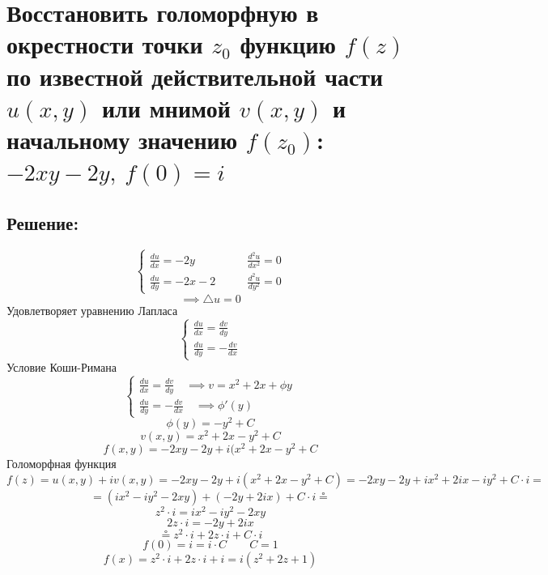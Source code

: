 \documentclass{article}
\begin{document}
         \section{Восстановить голоморфную в окрестности точки $z_0$ функцию $f(z)$ по известной действительной части $u(x,y)$ или мнимой $v(x,y)$ и начальному значению $f(z_0)$: $-2xy-2y, \ f(0) = i$}
	\subsection{Решение:}
        \begin{equation}
        \left\{
        \begin{array}{ll}
        \frac{du}{dx} = -2y & \quad\quad \frac{d^2u}{dx^2} = 0 \\
        \frac{du}{dy} = -2x - 2 & \quad\quad \frac{d^2u}{dy^2} = 0
        \end{array}
        \right.
        \end{equation}
        $$\implies \triangle u = 0$$
        Удовлетворяет уравнению Лапласа \\
         \begin{equation}
        \left\{
        \begin{array}{ll}
        \frac{du}{dx} = \frac{dv}{dy} \\
        \frac{du}{dy} = -\frac{dv}{dx}
        \end{array}
        \right.
        \end{equation}
        Условие Коши-Римана\\
        \begin{equation}
        \left\{
        \begin{array}{ll}
        \frac{du}{dx} = \frac{dv}{dy} \quad \implies v = x^2 + 2x + \phi{y} \\
        \frac{du}{dy} = -\frac{dv}{dx} \quad \implies \phi'{(y)}
        \end{array}
        \right.
        \end{equation}
        $$\phi(y) = -y^2 + C$$
        $$v(x, y) = x^2 + 2x - y^2 + C$$
        $$f(x, y) = -2xy - 2y + i(x^2 + 2x - y^2 + C$$
        Голоморфная функция \\
        $$f(z) = u(x, y) + iv(x, y) = -2xy - 2y + i(x^2 + 2x - y^2 + C) = -2xy - 2y + ix^2 + 2ix - iy^2 + C \cdot i =$$
        $$= (ix^2 - iy^2 - 2xy) + (-2y + 2ix) + C \cdot i \circeq$$
        $$z^2 \cdot i = ix^2 - iy^2 - 2xy$$
        $$2z \cdot i = -2y + 2ix$$
        $$\circeq z^2 \cdot i + 2z \cdot i + C \cdot i$$
        $$f(0) = i = i \cdot C \quad\quad C = 1$$
        $$f(x) = z^2 \cdot i + 2z \cdot i + i = i(z^2 + 2z + 1)$$
\end{document}
